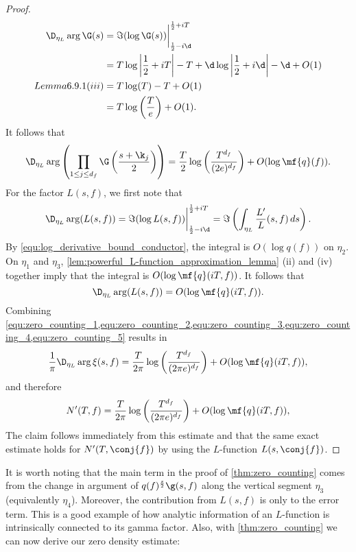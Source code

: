 \begin{proof}
\begin{align*}
        \D_{\eta_{L}}\arg\G(s) &= \Im(\log\G(s))\bigg|_{\frac{1}{2}-i\d}^{\frac{1}{2}+iT} \\
        &= T\log\left|\frac{1}{2}+iT\right|-T+\d\log\left|\frac{1}{2}+i\d\right|-\d+O(1) \\Lemma 6.9.1 (iii)
        &= T\log(T)-T+O(1) \\
        &= T\log\left(\frac{T}{e}\right)+O(1).
      \end{align*}
      It follows that
      \begin{equation}\label{equ:zero_counting_4}
        \D_{\eta_{L}}\arg\left(\prod_{1 \le j \le d_{f}}\G\left(\frac{s+\k_{j}}{2}\right)\right) = \frac{T}{2}\log\left(\frac{T^{d_{f}}}{(2e)^{d_{f}}}\right)+O(\log{\mf{q}(f)}).
      \end{equation}
      For the factor $L(s,f)$, we first note that
      \[
        \D_{\eta_{L}}\arg(L(s,f)) = \Im(\log{L(s,f)})\bigg|_{\frac{1}{2}-i\d}^{\frac{1}{2}+iT} = \Im\left(\int_{\eta_{L}}\frac{L'}{L}(s,f)\,ds\right).
      \]
      By \cref{equ:log_derivative_bound_conductor}, the integral is $O(\log{q(f)})$ on $\eta_{2}$. On $\eta_{1}$ and $\eta_{3}$, \cref{lem:powerful_L-function_approximation_lemma} (ii) and (iv) together imply that the integral is $O(\log{\mf{q}(iT,f)})$. It follows that
      \begin{equation}\label{equ:zero_counting_5}
        \D_{\eta_{L}}\arg(L(s,f)) = O(\log{\mf{q}(iT,f)}).
      \end{equation}
      Combining \cref{equ:zero_counting_1,equ:zero_counting_2,equ:zero_counting_3,equ:zero_counting_4,equ:zero_counting_5} results in
      \[
        \frac{1}{\pi}\D_{\eta_{L}}\arg\xi(s,f) = \frac{T}{2\pi}\log\left(\frac{T^{d_{f}}}{(2\pi e)^{d_{f}}}\right)+O(\log{\mf{q}(iT,f)}),
      \]
      and therefore
      \[
        N'(T,f) = \frac{T}{2\pi}\log\left(\frac{T^{d_{f}}}{(2\pi e)^{d_{f}}}\right)+O(\log{\mf{q}(iT,f)}),
      \]
      The claim follows immediately from this estimate and that the same exact estimate holds for $N'(T,\conj{f})$ by using the $L$-function $L(s,\conj{f})$.
    \end{proof}

    It is worth noting that the main term in the proof of \cref{thm:zero_counting} comes from the change in argument of $q(f)^{\frac{s}{2}}\g(s,f)$ along the vertical segment $\eta_{3}$ (equivalently $\eta_{4}$). Moreover, the contribution from $L(s,f)$ is only to the error term. This is a good example of how analytic information of an $L$-function is intrinsically connected to its gamma factor. Also, with \cref{thm:zero_counting} we can now derive our zero density estimate:


